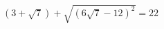 \begin{ex}[type=chek_eq]
	\begin{condition}
		\( (3+\sqrt{7})+\sqrt{(6\sqrt{7}-12)^2}=22 \)
	\end{condition}
\end{ex}
